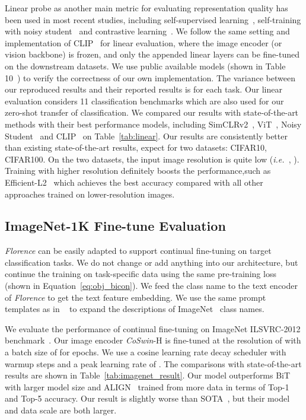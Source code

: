 \documentclass{article}
\newcommand{\ie}{{\it{i.e.}~}}
\begin{document}
Linear probe as another main metric for evaluating representation quality has been used in most
recent studies, including self-supervised learning~\cite{pmlr-v119-chen20j, chen2020big},
self-training with noisy student~\cite{Xie_2020_CVPR} and contrastive
learning~\cite{radford2021learning}. We follow the same setting and implementation of
CLIP~\cite{radford2021learning} for linear evaluation, where the image encoder (or vision backbone)
is frozen, and only the appended linear layers can be fine-tuned on the downstream datasets. We use public available models (shown in Table 10~\cite{radford2021learning}) to verify the correctness of our own implementation. The variance between our reproduced results and their reported results is  for each task. Our linear evaluation considers 11 classification
benchmarks which are also used for our zero-shot transfer of classification. We compared our results with state-of-the-art methods with their best performance models, including SimCLRv2~\cite{chen2020big},
ViT~\cite{dosovitskiy2020vit}, Noisy Student~\cite{Xie_2020_CVPR} and
CLIP~\cite{radford2021learning} on Table~\ref{tab:linear}. Our results are consistently  better than
existing state-of-the-art results, expect for two datasets: CIFAR10, CIFAR100. On the two datasets, the input image
resolution is quite low (\ie, ). Training with higher resolution definitely boosts the performance,such as  Efficient-L2~\cite{Xie_2020_CVPR} which achieves the best accuracy compared with all other approaches trained on lower-resolution images.

\subsection{ImageNet-1K Fine-tune Evaluation}
\label{sect:imagenet_finetune}

\emph{Florence} can be easily adapted to support continual fine-tuning on target classification
tasks. We do not change or add anything into our architecture, but continue the training on
task-specific data using the same pre-training loss (shown in Equation~\ref{eq:obj_bicon}). We feed the class name to the text
encoder of \emph{Florence} to get the text feature embedding. We use the same prompt templates as in
~\cite{radford2021learning, jia2021scaling} to expand the descriptions of
ImageNet~\cite{deng2009imagenet} class names.

We evaluate the performance of continual fine-tuning on ImageNet ILSVRC-2012
benchmark~\cite{deng2009imagenet}. Our image encoder \emph{CoSwin}-H is
fine-tuned at the resolution of  with a batch size of  for  epochs. We use a cosine learning rate decay scheduler with  warmup steps and a peak learning rate of
. The comparisons with state-of-the-art results are shown in
Table~\ref{tab:imagenet_result}. Our model outperforms BiT~\cite{kolesnikov2020big} with larger model size and ALIGN~\cite{jia2021scaling} trained from more data in terms of Top-1 and Top-5 accuracy. Our result is slightly worse than SOTA~\cite{dai2021coatnet}, but their model and data scale are both  larger.
\end{document}
